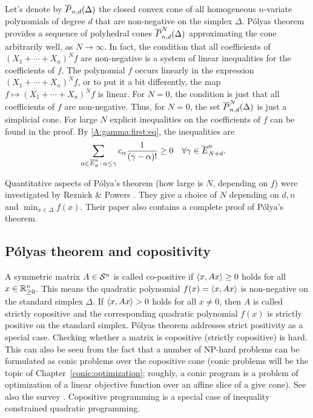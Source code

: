 \begin{remark}
	\label{polya:through:polyhedra}
	Let's denote by $\overline{P}_{n,d}(\Delta)$ the closed convex cone of all homogeneous $n$-variate polynomials of degree $d$ that are non-negative on the simplex $\Delta$. P\'olyas theorem provides a sequence of polyhedral cones $\overline{P}_{n,d}^N(\Delta)$ approximating the cone arbitrarily well, as $N \to \infty$. In fact, the condition that all coefficients of $(X_1+\cdots +X_n)^N f$ are non-negative is a system of linear inequalities for the coefficients of $f$. The polynomial $f$ occurs linearly in the expression $(X_1+\cdots + X_n)^N f$, or to put it a bit differently, the map $f \mapsto (X_1+ \cdots +X_n)^N f$ is linear. For $N=0$, the condition is just that all coefficients of $f$ are non-negative. Thus, for $N=0$, the set $\overline{P}_{n,d}^N(\Delta)$ is just a simplicial cone. For large $N$ explicit inequalities on the coefficients of $f$ can be found in the proof. By \eqref{A:gamma:first:eq}, the inequalities are 
	\begin{align*}
		\sum_{\alpha \in \overline{E}^n_d \,:\, \alpha \le \gamma} c_\alpha \frac{1}{(\gamma-\alpha)!} & \ge 0 & & \forall \gamma \in \overline{E}^n_{N+d}.
	\end{align*}
\end{remark}


\begin{remark}
	Quantitative aspects of P\'olya's theorem (how large is $N$, depending on $f$) were investigated by Reznick \& Powers \cite{Powers:Reznick:2001}. They give a choice of $N$ depending on $d,n$ and $\min_{x \in \Delta} f(x)$. Their paper also contains a complete proof of P\'olya's theorem. 
\end{remark}

\subsection{P\'olyas theorem and copositivity} 

A symmetric matrix $A \in \mathcal{S}^n$ is called co-positive if $\left\langle x , A x \right\rangle \ge 0$ holds for all $x \in \mathbb{R}_{\ge 0}^n$. This means the quadratic polynomial $f(x) = \left\langle x , A x \right\rangle$ is non-negative on the standard simplex $\Delta$. If $\left\langle x , Ax \right\rangle>0$ holds for all $x \ne 0$, then $A$ is called strictly copositive and the corresponding quadratic polynomial $f(x)$ is strictly positive on the standard simplex. P\'olyas theorem addresses strict positivity as a special case. Checking whether a matrix is copositive (strictly copositive) is hard. This can also be seen from the fact that a number of NP-hard problems can be formulated as conic problems over the copositive cone (conic problems will be the topic of Chapter~\ref{conic:optimization}; roughly, a conic program is a problem of optimization of a linear objective function over an affine slice of a give cone). See also the survey \cite{dur2010copositive}. Copositive programming is a special case of inequality constrained quadratic programming. 

